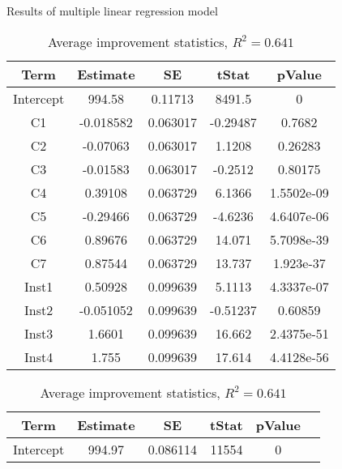 \documentclass[../main.tex]{subfiles}
\begin{document}
\begin{table}
    \centering
    \caption{Results of multiple linear regression model}
    \begin{adjustbox}{width=\columnwidth,center}
        \begin{subtable}{.75\columnwidth}
            \centering
            \begin{tabular}{ccccc}
            \hline
            Term    &Estimate   & SE    & tStat & pValue \\ 
            \hline                
        Intercept   & 994.58    & 0.11713       & 8491.5    & 0         \\
            C1      & -0.018582 & 0.063017      & -0.29487  & 0.7682    \\
            C2      & -0.07063  & 0.063017      & 1.1208    & 0.26283   \\
            C3      & -0.01583  & 0.063017      & -0.2512   & 0.80175   \\
            C4      & 0.39108   & 0.063729      & 6.1366    & 1.5502e-09\\
            C5      & -0.29466  & 0.063729      & -4.6236   & 4.6407e-06\\
            C6      & 0.89676   & 0.063729      & 14.071    & 5.7098e-39\\
            C7      & 0.87544   & 0.063729      & 13.737    & 1.923e-37 \\
            Inst1   & 0.50928   & 0.099639      & 5.1113    & 4.3337e-07\\
            Inst2   & -0.051052 & 0.099639      & -0.51237  & 0.60859   \\
            Inst3   & 1.6601    & 0.099639      & 16.662    & 2.4375e-51\\
            Inst4   & 1.755     &  0.099639     & 17.614    & 4.4128e-56\\
            \hline
            \end{tabular}
        \caption{Average improvement statistics, $R^2=0.641$}
        \label{tab:regrAvrgNormal}
        \end{subtable}
        \hfill
        \begin{subtable}{.75\columnwidth}
            \centering
            \begin{tabular}{cccccc}
            \hline
            Term    &Estimate   & SE    & tStat & pValue \\ 
            \hline                
        Intercept   & 994.97    & 0.086114      & 11554     & 0         \\

\end{tabular}
\end{subtable}
\end{adjustbox}
\end{table}
\end{document}

